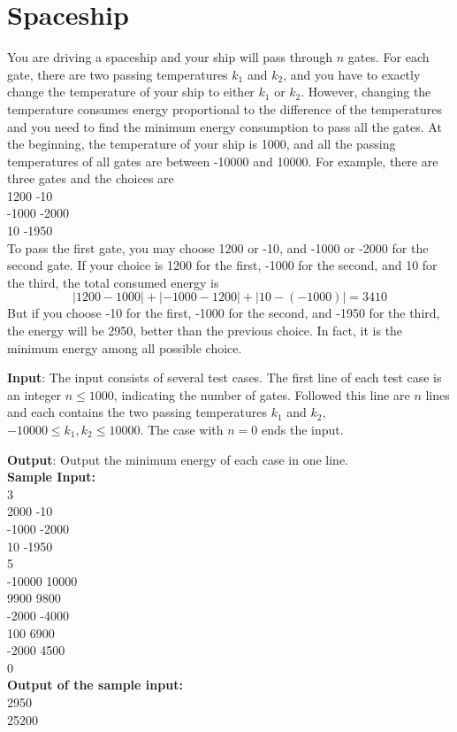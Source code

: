 \documentclass[12pt,titlepage]{article}
\begin{document}
\section*{\centering Spaceship}
You are driving a spaceship and your ship will pass through $n$ gates. For each gate, there are two passing temperatures $k_1$ and $k_2$, and you have to exactly change the temperature of your ship to either $k_1$ or $k_2$. 
However, changing the temperature consumes energy proportional to the difference of the temperatures and you need to find the minimum energy consumption to pass all the gates. At the beginning, the temperature of your ship is 1000, and all the passing temperatures of all gates are between -10000 and 10000.
For example, there are three gates and the choices are \\
	1200 -10\\
	-1000 -2000\\
	10 -1950\\
To pass the first gate, you may choose 1200 or -10, and -1000 or -2000 for the second gate. If your choice is 1200 for the first, -1000 for the second, and 10 for the third, the total consumed energy is 
\[ |1200-1000|+|-1000-1200|+|10-(-1000)|=3410  \]
But if you choose -10 for the first, -1000 for the second, and -1950 for the third, the energy will be 2950, better than the previous choice. In fact, it is the minimum energy among all possible choice.

\vspace*{.1in}
\noindent
{\large \bfseries Input}:
The input consists of several test cases. The first line of each test case is an integer $n\leq 1000$, indicating the number of gates. Followed this line are $n$ lines and each contains the two passing temperatures $k_1$ and $k_2$, $-10000\leq k_1,k_2\leq 10000$. The case with $n=0$ ends the input.

\vspace*{.1in}
\noindent
{\large \bfseries Output}:
Output the minimum energy of each case in one line. \\

{\flushleft \bf Sample Input:}\\
3\\
2000 -10\\
-1000 -2000\\
10 -1950\\
5\\
-10000 10000\\
9900 9800\\
-2000 -4000\\
100 6900\\
-2000 4500\\
0\\

{\flushleft \bf Output of the sample input:}\\ 
2950\\
25200\\
\end{document}
